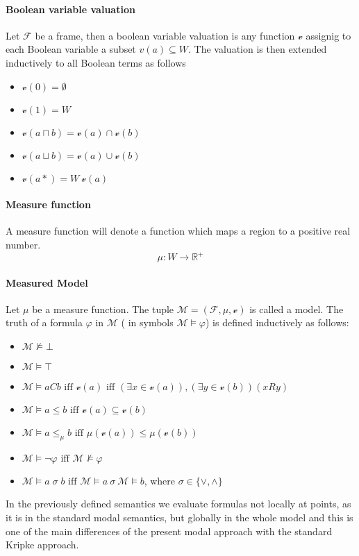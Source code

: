 \documentclass{article}
\begin{document}
	\paragraph{Boolean variable valuation}
Let $\mathcal{F}$  be a frame, then a boolean variable valuation is any function $\mathscr{v}$ assignig to each Boolean variable a subset $v(a) \subseteq W$. The valuation is then extended inductively to all Boolean terms as follows
		\begin{itemize}
			\item $\mathscr{v}(0) = \emptyset$
			\item $\mathscr{v}(1) = W$
			\item $\mathscr{v}(a \sqcap b) = \mathscr{v}(a) \cap \mathscr{v}(b)$
			\item $\mathscr{v}(a \sqcup b) = \mathscr{v}(a) \cup \mathscr{v}(b)$
			\item $\mathscr{v}(a*) = W \ \mathscr{v}(a)$
		\end{itemize}

	\paragraph{Measure function} A measure function will denote a function which maps a region to a positive real number.
		\begin{equation*}
			\mu : W \longrightarrow \mathbb{R}^+
		\end{equation*}

	\paragraph{Measured Model} Let $\mu$ be a measure function. The tuple $\mathcal{M} = (\mathcal{F}, \mu, \mathscr{v})$ is called a model. The truth of a formula $\varphi$ in $\mathcal{M}$ ( in symbols $\mathcal{M} \models \varphi$) is defined inductively as follows:
		\begin{itemize}
			\item $\mathcal{M} \not\models \bot$ 
			\item $\mathcal{M} \models \top$
			\item $\mathcal{M} \models aCb \text{ iff } \mathscr{v}(a) \text{ iff } (\exists x \in \mathscr{v}(a)), (\exists y \in \mathscr{v}(b)) (xRy)$
			\item $\mathcal{M} \models a \leq b \text{ iff } \mathscr{v}(a) \subseteq \mathscr{v}(b)$
			\item $\mathcal{M} \models a \leq_\mu b \text{ iff } \mu(\mathscr{v}(a)) \le \mu(\mathscr{v}(b))$
			\item $\mathcal{M} \models \neg \varphi \text{ iff } \mathcal{M} \not\models \varphi$
			\item $\mathcal{M} \models a \; \sigma \; b \text{ iff } \mathcal{M} \models a \: \sigma \: \mathcal{M} \models b$, where $\sigma \in \{ \vee, \wedge \}$
		\end{itemize}
In the previously defined semantics we evaluate formulas not locally at points, as it is in the standard modal semantics, but globally in the whole model and this is one of the main differences of the present modal approach with the standard Kripke approach.
\end{document}
